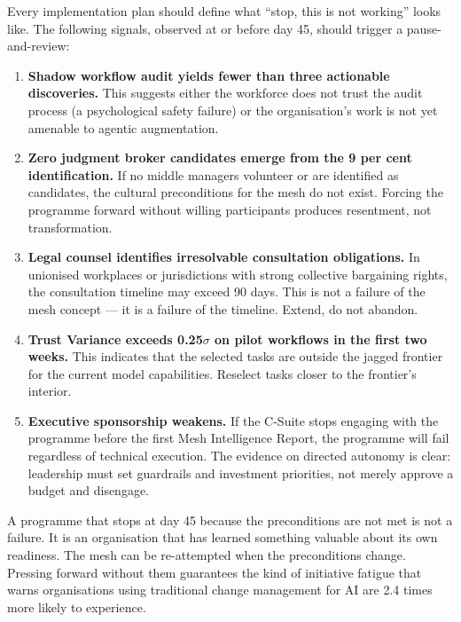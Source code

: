 Every implementation plan should define what ``stop, this is not working'' looks like. The following signals, observed at or before day 45, should trigger a pause-and-review:

\begin{enumerate}
  \item \textbf{Shadow workflow audit yields fewer than three actionable discoveries.} This suggests either the workforce does not trust the audit process (a psychological safety failure) or the organisation's work is not yet amenable to agentic augmentation.
  \item \textbf{Zero judgment broker candidates emerge from the 9 per cent identification.} If no middle managers volunteer or are identified as candidates, the cultural preconditions for the mesh do not exist. Forcing the programme forward without willing participants produces resentment, not transformation.
  \item \textbf{Legal counsel identifies irresolvable consultation obligations.} In unionised workplaces or jurisdictions with strong collective bargaining rights, the consultation timeline may exceed 90 days. This is not a failure of the mesh concept --- it is a failure of the timeline. Extend, do not abandon.
  \item \textbf{Trust Variance exceeds 0.25$\sigma$ on pilot workflows in the first two weeks.} This indicates that the selected tasks are outside the jagged frontier for the current model capabilities. Reselect tasks closer to the frontier's interior.
  \item \textbf{Executive sponsorship weakens.} If the C-Suite stops engaging with the programme before the first Mesh Intelligence Report, the programme will fail regardless of technical execution. The evidence on directed autonomy \parencite{MicrosoftDirectedAutonomy2025} is clear: leadership must set guardrails and investment priorities, not merely approve a budget and disengage.
\end{enumerate}

\begin{keyinsight}
A programme that stops at day 45 because the preconditions are not met is not a failure. It is an organisation that has learned something valuable about its own readiness. The mesh can be re-attempted when the preconditions change. Pressing forward without them guarantees the kind of initiative fatigue that \textcite{Gartner2025} warns organisations using traditional change management for AI are 2.4 times more likely to experience.
\end{keyinsight}

